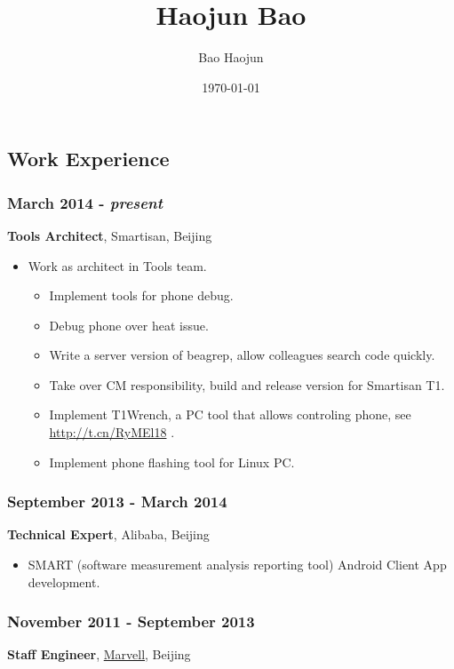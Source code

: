 \documentclass[11pt]{article}
\author{Bao Haojun}
\date{\today}
\title{Haojun Bao}
\begin{document}
\begin{CJK*}{UTF8}{simsun}

\maketitle



\section{Work Experience}
\label{sec-1}
\subsubsection{March 2014 - \emph{present}}
\label{sec-1-0-1}
\textbf{Tools Architect}, Smartisan, Beijing

\begin{itemize}
\item Work as architect in Tools team.
\begin{itemize}
\item Implement tools for phone debug.
\item Debug phone over heat issue.
\item Write a server version of beagrep, allow colleagues search code quickly.
\item Take over CM responsibility, build and release version for Smartisan T1.
\item Implement T1Wrench, a PC tool that allows controling phone, see \url{http://t.cn/RyMEl18} .
\item Implement phone flashing tool for Linux PC.
\end{itemize}
\end{itemize}

\subsubsection{September 2013 - March 2014}
\label{sec-1-0-2}
\textbf{Technical Expert}, Alibaba, Beijing
\begin{itemize}
\item SMART (software measurement analysis reporting tool) Android
Client App development.
\end{itemize}

\subsubsection{November 2011 - September 2013}
\label{sec-1-0-3}
\textbf{Staff Engineer}, \href{http://marvell.com}{Marvell}, Beijing


\end{CJK*}
\end{document}
